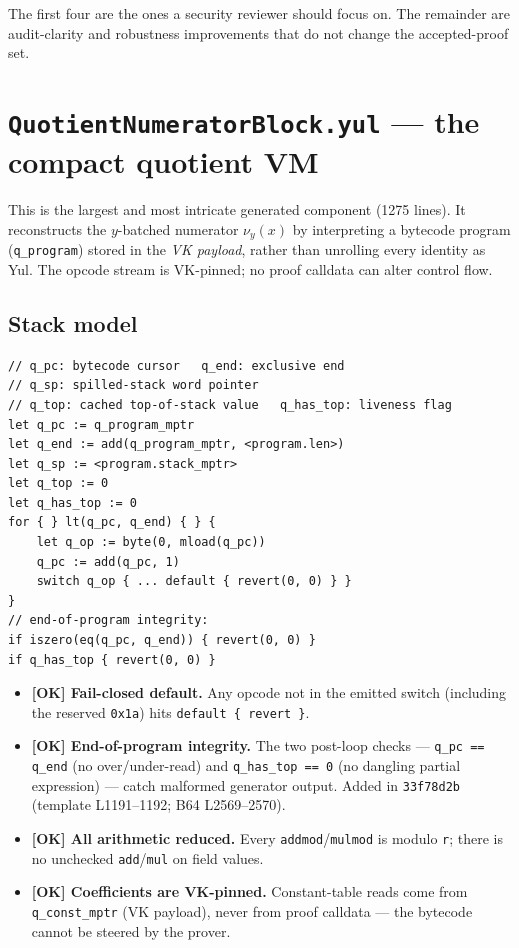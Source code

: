 The first four are the ones a security reviewer should focus on. The
remainder are audit-clarity and robustness improvements that do not
change the accepted-proof set.

\section{\texttt{QuotientNumeratorBlock.yul} --- the compact quotient VM}
\label{sec:vm-audit}

This is the largest and most intricate generated component (1275 lines).
It reconstructs the $y$-batched numerator $\nu_y(x)$ by interpreting a
bytecode program (\texttt{q\_program}) stored in the \emph{VK payload},
rather than unrolling every identity as Yul. The opcode stream is
VK-pinned; no proof calldata can alter control flow.

\subsection{Stack model}
\begin{lstlisting}[style=yul]
// q_pc: bytecode cursor   q_end: exclusive end
// q_sp: spilled-stack word pointer
// q_top: cached top-of-stack value   q_has_top: liveness flag
let q_pc := q_program_mptr
let q_end := add(q_program_mptr, <program.len>)
let q_sp := <program.stack_mptr>
let q_top := 0
let q_has_top := 0
for { } lt(q_pc, q_end) { } {
    let q_op := byte(0, mload(q_pc))
    q_pc := add(q_pc, 1)
    switch q_op { ... default { revert(0, 0) } }
}
// end-of-program integrity:
if iszero(eq(q_pc, q_end)) { revert(0, 0) }
if q_has_top { revert(0, 0) }
\end{lstlisting}

\begin{itemize}
  \item \textcolor{tracegreen}{\textbf{[OK] Fail-closed default.}} Any
        opcode not in the emitted switch (including the reserved
        \texttt{0x1a}) hits \texttt{default \{ revert \}}.
  \item \textcolor{tracegreen}{\textbf{[OK] End-of-program integrity.}}
        The two post-loop checks --- \texttt{q\_pc == q\_end} (no
        over/under-read) and \texttt{q\_has\_top == 0} (no dangling
        partial expression) --- catch malformed generator output. Added
        in \texttt{33f78d2b} (template L1191--1192; B64 L2569--2570).
  \item \textcolor{tracegreen}{\textbf{[OK] All arithmetic reduced.}}
        Every \texttt{addmod}/\texttt{mulmod} is modulo \texttt{r};
        there is no unchecked \texttt{add}/\texttt{mul} on field values.
  \item \textcolor{tracegreen}{\textbf{[OK] Coefficients are VK-pinned.}}
        Constant-table reads come from \texttt{q\_const\_mptr} (VK
        payload), never from proof calldata --- the bytecode cannot be
        steered by the prover.
\end{itemize}


